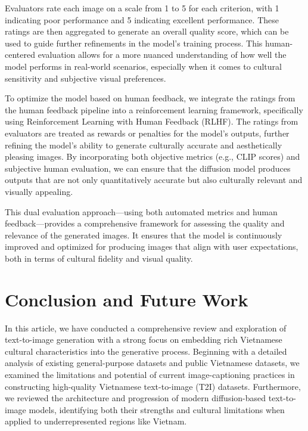 \documentclass[conference]{IEEEtran}
\begin{document}
Evaluators rate each image on a scale from 1 to 5 for each criterion, with 1 indicating poor performance and 5 indicating excellent performance. These ratings are then aggregated to generate an overall quality score, which can be used to guide further refinements in the model's training process. This human-centered evaluation allows for a more nuanced understanding of how well the model performs in real-world scenarios, especially when it comes to cultural sensitivity and subjective visual preferences.

To optimize the model based on human feedback, we integrate the ratings from the human feedback pipeline into a reinforcement learning framework, specifically using Reinforcement Learning with Human Feedback (RLHF). The ratings from evaluators are treated as rewards or penalties for the model’s outputs, further refining the model’s ability to generate culturally accurate and aesthetically pleasing images. By incorporating both objective metrics (e.g., CLIP scores) and subjective human evaluation, we can ensure that the diffusion model produces outputs that are not only quantitatively accurate but also culturally relevant and visually appealing.

This dual evaluation approach—using both automated metrics and human feedback—provides a comprehensive framework for assessing the quality and relevance of the generated images. It ensures that the model is continuously improved and optimized for producing images that align with user expectations, both in terms of cultural fidelity and visual quality.

\section{Conclusion and Future Work}
\label{sec:conclusion}

In this article, we have conducted a comprehensive review and exploration of text-to-image generation with a strong focus on embedding rich Vietnamese cultural characteristics into the generative process. Beginning with a detailed analysis of existing general-purpose datasets and public Vietnamese datasets, we examined the limitations and potential of current image-captioning practices in constructing high-quality Vietnamese text-to-image (T2I) datasets. Furthermore, we reviewed the architecture and progression of modern diffusion-based text-to-image models, identifying both their strengths and cultural limitations when applied to underrepresented regions like Vietnam.
\end{document}
